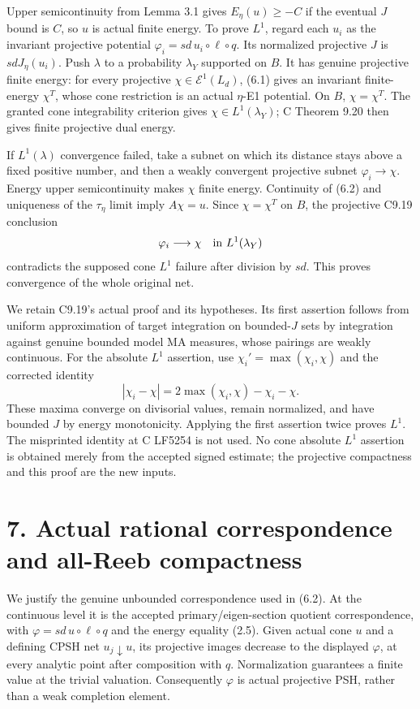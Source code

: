 \documentclass[
  10pt,
]{article}
\begin{document}
Upper semicontinuity from Lemma 3.1 gives \(E_\eta(u)\ge- C\) if the
eventual \(J\) bound is \(C\), so \(u\) is actual finite energy. To
prove \(L^1\), regard each \(u_i\) as the invariant projective potential
\(\varphi_i=sd\,u_i\circ\ell\circ q\). Its normalized projective \(J\)
is \(sdJ_\eta(u_i)\). Push \(\lambda\) to a probability \(\lambda_Y\)
supported on \(B\). It has genuine projective finite energy: for every
projective \(\chi\in\mathcal E^1(L_d)\), (6.1) gives an invariant
finite-energy \(\chi^T\), whose cone restriction is an actual
\(\eta\)-E1 potential. On \(B\), \(\chi=\chi^T\). The granted cone
integrability criterion gives \(\chi\in L^1(\lambda_Y)\); C Theorem 9.20
then gives finite projective dual energy.

If \(L^1(\lambda)\) convergence failed, take a subnet on which its
distance stays above a fixed positive number, and then a weakly
convergent projective subnet \(\varphi_i\to\chi\). Energy upper
semicontinuity makes \(\chi\) finite energy. Continuity of (6.2) and
uniqueness of the \(\tau_\eta\) limit imply \(A\chi=u\). Since
\(\chi=\chi^T\) on \(B\), the projective C9.19 conclusion \[
\varphi_i\longrightarrow\chi\quad\hbox{in }L^1(\lambda_Y)
\] contradicts the supposed cone \(L^1\) failure after division by
\(sd\). This proves convergence of the whole original net.

We retain C9.19's actual proof and its hypotheses. Its first assertion
follows from uniform approximation of target integration on
bounded-\(J\) sets by integration against genuine bounded model MA
measures, whose pairings are weakly continuous. For the absolute \(L^1\)
assertion, use \(\chi_i'=\max(\chi_i,\chi)\) and the corrected identity
\[
|\chi_i-\chi|=2\max(\chi_i,\chi)-\chi_i-\chi.
\] These maxima converge on divisorial values, remain normalized, and
have bounded \(J\) by energy monotonicity. Applying the first assertion
twice proves \(L^1\). The misprinted identity at C LF5254 is not used.
No cone absolute \(L^1\) assertion is obtained merely from the accepted
signed estimate; the projective compactness and this proof are the new
inputs.

\section{7. Actual rational correspondence and all-Reeb
compactness}\label{actual-rational-correspondence-and-all-reeb-compactness}

We justify the genuine unbounded correspondence used in (6.2). At the
continuous level it is the accepted primary/eigen-section quotient
correspondence, with \(\varphi=sd\,u\circ\ell\circ q\) and the energy
equality (2.5). Given actual cone \(u\) and a defining CPSH net
\(u_j\downarrow u\), its projective images decrease to the displayed
\(\varphi\), at every analytic point after composition with \(q\).
Normalization guarantees a finite value at the trivial valuation.
Consequently \(\varphi\) is actual projective PSH, rather than a weak
completion element.
\end{document}
